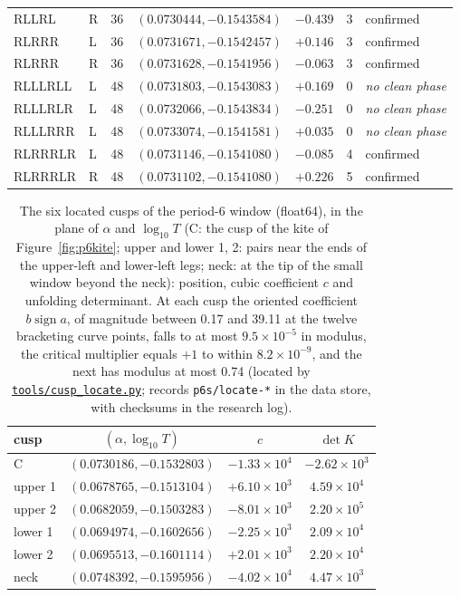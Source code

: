 \documentclass[11pt,letterpaper]{article}
\newcommand{\repourl}{https://github.com/tdj28/neural-shrimp}
\newcommand{\reporef}{arxiv-v1}
\newcommand{\repo}[1]{\href{\repourl/blob/\reporef/#1}{\nolinkurl{#1}}}
\begin{document}
\begin{table}[tbp]
\begin{tabular}{llrlrrl}
RLLRL & R & 36 & $(0.0730444, -0.1543584)$ & $-0.439$ & 3 & confirmed \\
RLRRR & L & 36 & $(0.0731671, -0.1542457)$ & $+0.146$ & 3 & confirmed \\
RLRRR & R & 36 & $(0.0731628, -0.1541956)$ & $-0.063$ & 3 & confirmed \\
RLLLRLL & L & 48 & $(0.0731803, -0.1543083)$ & $+0.169$ & 0 & \emph{no clean phase} \\
RLLLRLR & L & 48 & $(0.0732066, -0.1543834)$ & $-0.251$ & 0 & \emph{no clean phase} \\
RLLLRRR & L & 48 & $(0.0733074, -0.1541581)$ & $+0.035$ & 0 & \emph{no clean phase} \\
RLRRRLR & L & 48 & $(0.0731146, -0.1541080)$ & $-0.085$ & 4 & confirmed \\
RLRRRLR & R & 48 & $(0.0731102, -0.1541080)$ & $+0.226$ & 5 & confirmed \\
\bottomrule
\end{tabular}
\end{table}
\begin{table}[tbp]
\centering
\caption{The six located cusps of the period-6 window (float64), in the plane of $\alpha$ and $\log_{10}T$ (C: the cusp
of the kite of Figure~\ref{fig:p6kite}; upper and lower 1, 2: pairs near the ends of the upper-left and lower-left legs;
neck: at the tip of the small window beyond the neck): position, cubic coefficient $c$ and unfolding determinant. At each cusp the oriented coefficient $b\operatorname{sign}a$, of magnitude between 0.17 and 39.11 at the twelve
bracketing curve points, falls to at most $9.5\times10^{-5}$ in modulus, the critical multiplier equals $+1$ to within
$8.2\times10^{-9}$, and the next has modulus at most 0.74 (located by \repo{tools/cusp_locate.py}; records
\texttt{p6s/locate-*} in the data store, with checksums in the research log).}
\label{tab:p6cusps}
\begin{tabular}{lccc}
\toprule
cusp & $(\alpha,\log_{10}T)$ & $c$ & $\det K$ \\
\midrule
C & $(0.0730186, -0.1532803)$ & $-1.33\times10^{4}$ & $-2.62\times10^{3}$ \\
upper 1 & $(0.0678765, -0.1513104)$ & $+6.10\times10^{3}$ & $4.59\times10^{4}$ \\
upper 2 & $(0.0682059, -0.1503283)$ & $-8.01\times10^{3}$ & $2.20\times10^{5}$ \\
lower 1 & $(0.0694974, -0.1602656)$ & $-2.25\times10^{3}$ & $2.09\times10^{4}$ \\
lower 2 & $(0.0695513, -0.1601114)$ & $+2.01\times10^{3}$ & $2.20\times10^{4}$ \\
neck & $(0.0748392, -0.1595956)$ & $-4.02\times10^{4}$ & $4.47\times10^{3}$ \\
\bottomrule
\end{tabular}
\end{table}
\end{document}
